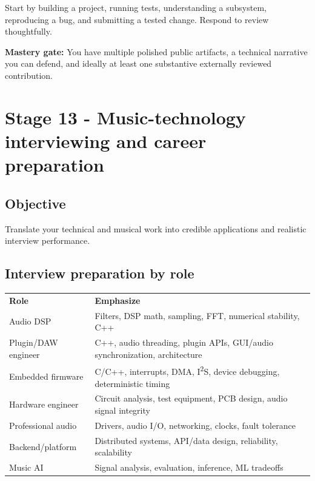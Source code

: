 \documentclass[11pt,letterpaper]{article}
\begin{document}
Start by building a project, running tests, understanding a subsystem, reproducing a bug, and submitting a tested change. Respond to review thoughtfully.

\textbf{Mastery gate:} You have multiple polished public artifacts, a technical narrative you can defend, and ideally at least one substantive externally reviewed contribution.

\clearpage

\section{Stage 13 - Music-technology interviewing and career preparation}\label{stage-13-music-technology-interviewing-and-career-preparation}

\subsection*{Objective}\label{objective-13}

Translate your technical and musical work into credible applications and realistic interview performance.

\subsection*{Interview preparation by role}\label{interview-preparation-by-role}

\begin{center}
\small
\begin{tabular}{>{\raggedright\arraybackslash}p{}>{\raggedright\arraybackslash}p{}}
\textbf{Role} & \textbf{Emphasize} \\
Audio DSP & Filters, DSP math, sampling, FFT, numerical stability, C++ \\
Plugin/DAW engineer & C++, audio threading, plugin APIs, GUI/audio synchronization, architecture \\
Embedded firmware & C/C++, interrupts, DMA, I\textsuperscript{2}S, device debugging, deterministic timing \\
Hardware engineer & Circuit analysis, test equipment, PCB design, audio signal integrity \\
Professional audio & Drivers, audio I/O, networking, clocks, fault tolerance \\
Backend/platform & Distributed systems, API/data design, reliability, scalability \\
Music AI & Signal analysis, evaluation, inference, ML tradeoffs \\
\end{tabular}
\end{center}
\end{document}
